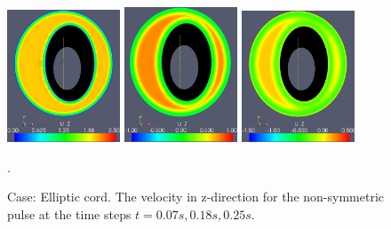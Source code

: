 \begin{figure}\begin{center}
\includegraphics[width=0.3\textwidth]{chapters/haughton/eps_images/pulse_f1_08_elliptic_sysmax_nmb7.eps}
\includegraphics[width=0.3\textwidth]{chapters/haughton/eps_images/pulse_f1_08_elliptic_sysdia_nmb18.eps}
\includegraphics[width=0.3\textwidth]{chapters/haughton/eps_images/pulse_f1_08_elliptic_diamin1_nmb25.eps}
\caption{Case: Elliptic cord. The velocity in z-direction for the non-symmetric pulse at the time steps $t=0.07s, 0.18s, 0.25s$.}
\label{fig:case3}. 
\end{center}\end{figure}




